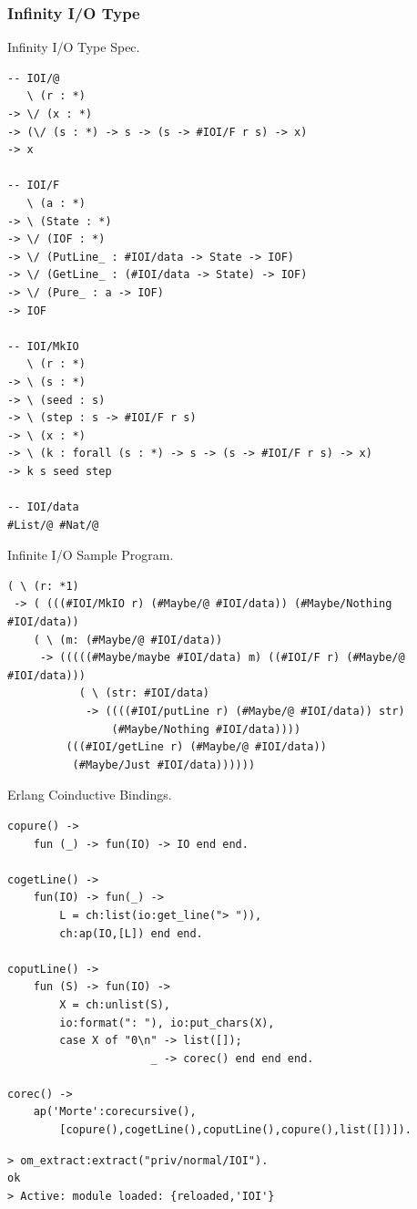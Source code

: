 \documentclass[11pt,oneside]{article}
\begin{document}
\subsubsection{Infinity I/O Type}

Infinity I/O Type Spec.

\begin{lstlisting}[mathescape=true]
-- IOI/@
   \ (r : *)
-> \/ (x : *)
-> (\/ (s : *) -> s -> (s -> #IOI/F r s) -> x)
-> x

-- IOI/F
   \ (a : *)
-> \ (State : *)
-> \/ (IOF : *)
-> \/ (PutLine_ : #IOI/data -> State -> IOF)
-> \/ (GetLine_ : (#IOI/data -> State) -> IOF)
-> \/ (Pure_ : a -> IOF)
-> IOF

-- IOI/MkIO
   \ (r : *)
-> \ (s : *)
-> \ (seed : s)
-> \ (step : s -> #IOI/F r s)
-> \ (x : *)
-> \ (k : forall (s : *) -> s -> (s -> #IOI/F r s) -> x)
-> k s seed step

-- IOI/data
#List/@ #Nat/@
\end{lstlisting}

\newpage
Infinite I/O Sample Program.

\begin{lstlisting}[mathescape=true]
( \ (r: *1)
 -> ( (((#IOI/MkIO r) (#Maybe/@ #IOI/data)) (#Maybe/Nothing #IOI/data))
    ( \ (m: (#Maybe/@ #IOI/data))
     -> (((((#Maybe/maybe #IOI/data) m) ((#IOI/F r) (#Maybe/@ #IOI/data)))
           ( \ (str: #IOI/data)
            -> ((((#IOI/putLine r) (#Maybe/@ #IOI/data)) str)
                (#Maybe/Nothing #IOI/data))))
         (((#IOI/getLine r) (#Maybe/@ #IOI/data))
          (#Maybe/Just #IOI/data))))))
\end{lstlisting}

Erlang Coinductive Bindings.

\begin{lstlisting}[mathescape=true]
copure() ->
    fun (_) -> fun(IO) -> IO end end.

cogetLine() ->
    fun(IO) -> fun(_) ->
        L = ch:list(io:get_line("> ")),
        ch:ap(IO,[L]) end end.

coputLine() ->
    fun (S) -> fun(IO) ->
        X = ch:unlist(S),
        io:format(": "), io:put_chars(X),
        case X of "0\n" -> list([]);
                      _ -> corec() end end end.

corec() ->
    ap('Morte':corecursive(),
        [copure(),cogetLine(),coputLine(),copure(),list([])]).
\end{lstlisting}

\begin{lstlisting}[mathescape=true]
> om_extract:extract("priv/normal/IOI").
ok
> Active: module loaded: {reloaded,'IOI'}
\end{lstlisting}
\end{document}
